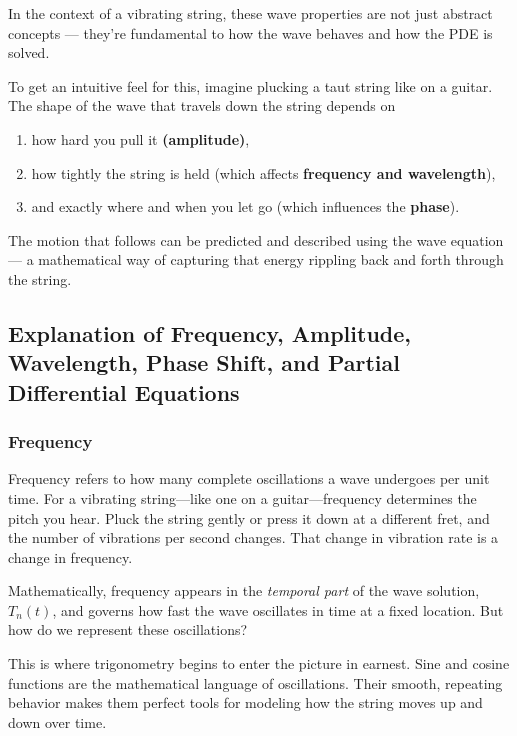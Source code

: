 \vspace{1.5em}


In the context of a vibrating string, these wave properties are not just abstract concepts — they’re fundamental to how the wave behaves and how the PDE is solved.

To get an intuitive feel for this, imagine plucking a taut string like on a guitar. The shape of the wave that travels down the string depends on 

\begin{enumerate}
	\item how hard you pull it \textbf{(amplitude)}, 
	\item how tightly the string is held (which affects \textbf{frequency and wavelength}), 
	\item and exactly where and when you let go (which influences the \textbf{phase}). 
\end{enumerate}
	
The motion that follows can be predicted and described using the wave equation — a mathematical way of capturing that energy rippling back and forth through the string.


\subsection{Explanation of Frequency, Amplitude, Wavelength, Phase Shift, and Partial Differential Equations}


\subsubsection{Frequency}

Frequency refers to how many complete oscillations a wave undergoes per unit time. For a vibrating string—like one on a guitar—frequency determines the pitch you hear. Pluck the string gently or press it down at a different fret, and the number of vibrations per second changes. That change in vibration rate is a change in frequency.

Mathematically, frequency appears in the \textit{temporal part} of the wave solution, \( T_n(t) \), and governs how fast the wave oscillates in time at a fixed location. But how do we represent these oscillations?

This is where trigonometry begins to enter the picture in earnest. Sine and cosine functions are the mathematical language of oscillations. Their smooth, repeating behavior makes them perfect tools for modeling how the string moves up and down over time.

